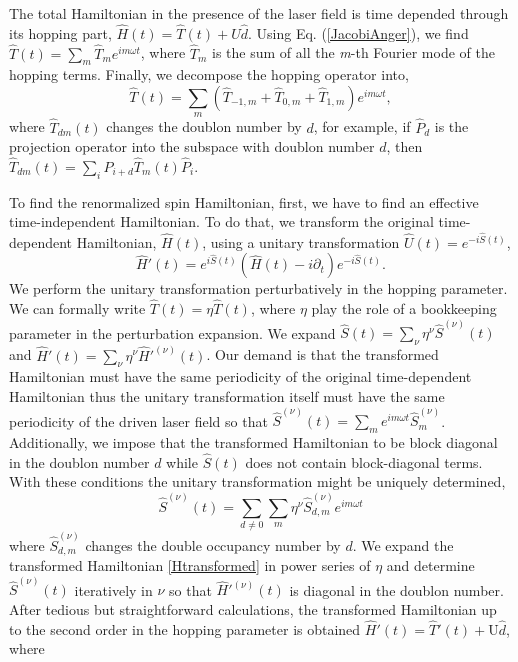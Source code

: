\documentclass[aps,prl,twocolumn,amsmath,amssymb,nobibnotes]{revtex4-1}%
\begin{document}
The total Hamiltonian in the presence of the laser field is time depended through its hopping part, $\hat{H}(t) = \hat{T}(t) +  U\hat{d}$. Using Eq. (\ref{JacobiAnger}), we find $\hat{T}(t) = \sum_m \hat{T}_m e^{im \omega t}$, where $\hat{T}_m$ is the sum of all the \textit{m}-th Fourier mode of the hopping terms. Finally, we decompose the hopping operator into,
\begin{equation}
\hat{T}(t) = \sum_m (\hat{T}_{-1,m}+\hat{T}_{0,m}+\hat{T}_{1,m})e^{im\omega t},
\end{equation}
where $\hat{T}_{dm}(t)$ changes the doublon number by $d$, for example, if $\hat{P}_d$ is the projection operator into the subspace with doublon number $d$, then $\hat{T}_{dm}(t) = \sum_i \hat{P}_{i+d}\hat{T}_{m}(t)\hat{P}_i$.

To find the renormalized spin Hamiltonian, first, we have to find an effective time-independent Hamiltonian. To do that, we transform the original time-dependent Hamiltonian, $\hat{H}(t)$, using a unitary transformation $\hat{U}(t) = e^{-i\hat{S}(t)}$,
\begin{equation}
\hat{H}'(t) = e^{i\hat{S}(t)} \left(\hat{H}(t)  -  i\partial_t \right) e^{-i\hat{S}(t)}.
\label{Htransformed}
\end{equation}
We perform the unitary transformation perturbatively in the hopping parameter. We can formally write $\hat{T}(t) = \eta \hat{T}(t)$, where $\eta$ play the role of a bookkeeping parameter in the perturbation expansion. We expand $\hat{S}(t) = \sum_\nu \eta^\nu \hat{S}^{(\nu)}(t)$ and $\hat{H}'(t) = \sum_\nu \eta^\nu \hat{H}'^{(\nu)}(t)$. Our demand is that the transformed Hamiltonian must have the same periodicity of the original time-dependent Hamiltonian thus the unitary transformation itself must have the same periodicity of the driven laser field so that $\hat{S}^{(\nu)}(t) = \sum_m e^{im\omega t}\hat{S}^{(\nu)}_m$. Additionally, we impose that the transformed Hamiltonian to be block diagonal in the doublon number $d$ while $\hat{S}(t)$ does not contain block-diagonal terms. With these conditions the unitary transformation might be uniquely determined,
\begin{equation}
\hat{S}^{(\nu)}(t) = \sum_{d \neq 0} \sum_m \eta^\nu \hat{S}^{(\nu)}_{d,m} e^{im\omega t}
\end{equation}
where $\hat{S}^{(\nu)}_{d,m}$ changes the double occupancy number by $d$. We expand the transformed Hamiltonian \ref{Htransformed} in power series of $\eta$ and determine $\hat{S}^{(\nu)}(t)$ iteratively in $\nu$ so that $\hat{H}'^{(\nu)}(t)$ is diagonal in the doublon number. After tedious but straightforward calculations, the transformed Hamiltonian up to the second order in the hopping parameter is obtained $\hat{H}'(t)= \hat{T}'(t)+\text{U}\hat{d}$, where
\end{document}
